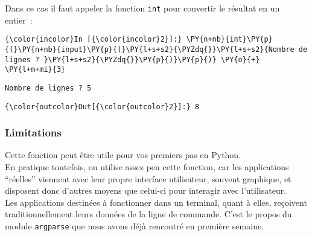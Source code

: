     \begin{Shaded}
\begin{Highlighting}[]
\OperatorTok{>>>} \NormalTok{(}\NormalTok{) }\OperatorTok{+} 
\NormalTok{, } \OperatorTok{<}\OperatorTok{>}
\NormalTok{, } 
\end{Highlighting}
\end{Shaded}

    Dans ce cas il faut appeler la fonction \texttt{int} pour convertir le
résultat en un entier~:

    \begin{Verbatim}[commandchars=\\\{\}]
{\color{incolor}In [{\color{incolor}2}]:} \PY{n+nb}{int}\PY{p}{(}\PY{n+nb}{input}\PY{p}{(}\PY{l+s+s2}{\PYZdq{}}\PY{l+s+s2}{Nombre de lignes ? }\PY{l+s+s2}{\PYZdq{}}\PY{p}{)}\PY{p}{)} \PY{o}{+} \PY{l+m+mi}{3}
\end{Verbatim}


    \begin{Verbatim}[commandchars=\\\{\}]
Nombre de lignes ? 5

    \end{Verbatim}

\begin{Verbatim}[commandchars=\\\{\}]
{\color{outcolor}Out[{\color{outcolor}2}]:} 8
\end{Verbatim}
            
    \hypertarget{limitations}{%
\subsubsection{Limitations}\label{limitations}}

    Cette fonction peut être utile pour vos premiers pas en Python.\\

En pratique toutefois, on utilise assez peu cette fonction, car les
applications ``réelles'' viennent avec leur propre interface
utilisateur, souvent graphique, et disposent donc d'autres moyens que
celui-ci pour interagir avec l'utilisateur.\\

Les applications destinées à fonctionner dans un terminal, quant à
elles, reçoivent traditionnellement leurs données de la ligne de
commande. C'est le propos du module \texttt{argparse} que nous avons
déjà rencontré en première semaine.